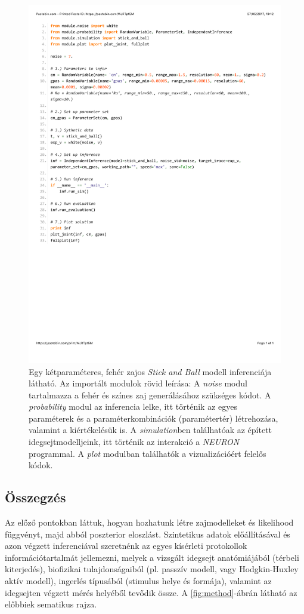 \begin{figure}[h!]
	\centering
	\includegraphics[width=\textwidth]{./fig/source.pdf}
	\caption[Egy futtatás példakódja]{Egy kétparaméteres, fehér zajos \textit{Stick and Ball} modell inferenciája látható. Az importált modulok rövid leírása: A \textit{noise} modul tartalmazza a fehér és színes zaj generálásához szükséges kódot. A \textit{probability} modul az inferencia lelke, itt történik az egyes paraméterek és a paraméterkombinációk (paramétertér) létrehozása, valamint a kiértékelésük is. A \textit{simulation}ben találhatóak az épített idegsejtmodelljeink, itt történik az interakció a \textit{NEURON} programmal. A \textit{plot} modulban találhatók a vizualizációért felelős kódok.}
	\label{fig:code}
\end{figure}

\FloatBarrier
\subsection{Összegzés}
Az előző pontokban láttuk, hogyan hozhatunk létre zajmodelleket és likelihood függvényt, majd abból poszterior eloszlást. Szintetikus adatok előállításával és azon végzett inferenciával szeretnénk az egyes kísérleti protokollok információtartalmát jellemezni, melyek a vizsgált idegsejt anatómiájából (térbeli kiterjedés), biofizikai tulajdonságaiból (pl. passzív modell, vagy Hodgkin-Huxley aktív modell), ingerlés típusából (stimulus helye és formája), valamint az idegsejten végzett mérés helyéből tevődik össze. A \ref{fig:method}-ábrán látható az előbbiek sematikus rajza.



